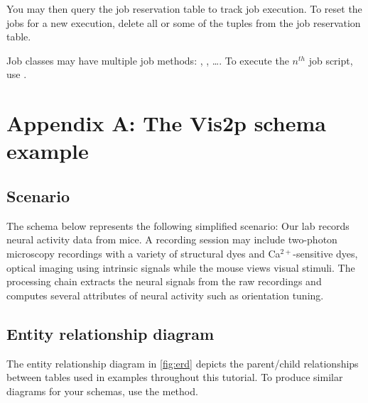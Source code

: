 \documentclass[10pt]{article}
\begin{document}
You may then query the job reservation table to track job execution. To reset the jobs for a new execution, delete all or some of the tuples from the job reservation table.

Job classes may have multiple job methods: , , \ldots.  To execute the $n^{th}$ job script, use .

\newpage\section{Appendix A: The Vis2p schema example}\label{sec:vis2p}
\subsection{Scenario}
The schema below represents the following simplified scenario: Our lab records neural activity data from mice. A recording session may include two-photon microscopy recordings with a variety of structural dyes and Ca$^{2+}$-sensitive dyes, optical imaging using intrinsic signals while the mouse views visual stimuli.  The processing chain extracts the neural signals from the raw recordings and computes several attributes of neural activity such as orientation tuning. 

\subsection{Entity relationship diagram}\label{sec:erd}
The entity relationship diagram in \autoref{fig:erd} depicts the parent/child relationships between tables used in examples throughout this tutorial. To produce similar diagrams for your schemas, use the  method.
\end{document}
